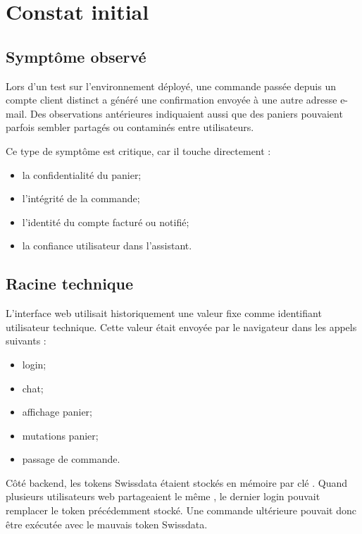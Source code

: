 \documentclass[11pt,a4paper]{article}
\newcommand{\code}[1]{\texttt{\detokenize{#1}}}
\begin{document}
\section{Constat initial}

\subsection{Symptôme observé}

Lors d'un test sur l'environnement déployé, une commande passée depuis un compte
client distinct a généré une confirmation envoyée à une autre adresse e-mail.
Des observations antérieures indiquaient aussi que des paniers pouvaient parfois
sembler partagés ou contaminés entre utilisateurs.

Ce type de symptôme est critique, car il touche directement :
\begin{itemize}
  \item la confidentialité du panier;
  \item l'intégrité de la commande;
  \item l'identité du compte facturé ou notifié;
  \item la confiance utilisateur dans l'assistant.
\end{itemize}

\subsection{Racine technique}

L'interface web utilisait historiquement une valeur fixe \code{local-dev} comme
identifiant utilisateur technique. Cette valeur était envoyée par le navigateur
dans les appels suivants :
\begin{itemize}
  \item login;
  \item chat;
  \item affichage panier;
  \item mutations panier;
  \item passage de commande.
\end{itemize}

Côté backend, les tokens Swissdata étaient stockés en mémoire par clé
\code{userRef}. Quand plusieurs utilisateurs web partageaient le même
\code{userRef}, le dernier login pouvait remplacer le token précédemment stocké.
Une commande ultérieure pouvait donc être exécutée avec le mauvais token
Swissdata.
\end{document}
